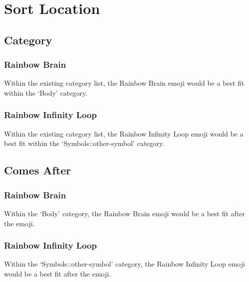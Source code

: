 \section{Sort Location}

\subsection{Category}

\subsubsection*{Rainbow Brain}

Within the existing category list, the Rainbow Brain emoji would be a best fit within the
`Body' category.

\subsubsection*{Rainbow Infinity Loop}

Within the existing category list, the Rainbow Infinity Loop emoji would be a best fit
within the `Symbols::other-symbol' category.

\subsection{Comes After}

\subsubsection*{Rainbow Brain}

Within the `Body' category, the Rainbow Brain emoji would be a best fit after the
\brainemoji{} emoji.

\subsubsection*{Rainbow Infinity Loop}

Within the `Symbols::other-symbol' category, the Rainbow Infinity Loop emoji would be
a best fit after the \infinityemoji{} emoji.
